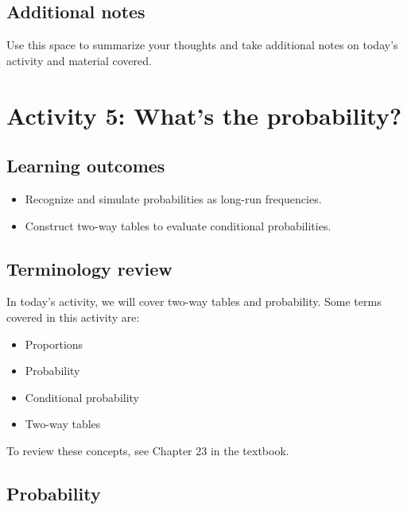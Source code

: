 \documentclass[
]{report}
\begin{document}
\subsection{Additional notes}\label{additional-notes-3}

Use this space to summarize your thoughts and take additional notes on today's activity and material covered.

\newpage

\section{Activity 5: What's the probability?}\label{activity-5-whats-the-probability}


\subsection{Learning outcomes}\label{learning-outcomes-4}

\begin{itemize}
\item
  Recognize and simulate probabilities as long-run frequencies.
\item
  Construct two-way tables to evaluate conditional probabilities.
\end{itemize}

\subsection{Terminology review}\label{terminology-review-4}

In today's activity, we will cover two-way tables and probability. Some terms covered in this activity are:

\begin{itemize}
\item
  Proportions
\item
  Probability
\item
  Conditional probability
\item
  Two-way tables
\end{itemize}

To review these concepts, see Chapter 23 in the textbook.

\subsection{Probability}\label{probability-2}
\end{document}
